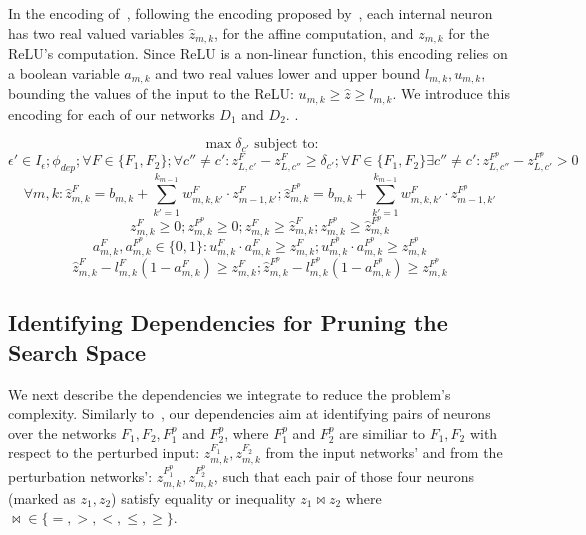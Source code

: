 In the encoding of~\cite{VHAGAR}, following the encoding proposed by~\cite{MIPVERIFY}, each internal neuron has two real valued variables $\hat{z}_{m,k}$, for the affine computation, and ${z}_{m,k}$ for the ReLU's computation. Since ReLU is a non-linear function, this encoding relies on a boolean variable $a_{m,k}$ and two real values lower and upper bound $l_{m,k},u_{m,k}$, bounding the values of the input to the ReLU: $u_{m,k}\geq{\hat{z}}\geq{l_{m,k}}$.
We introduce this encoding for each of our networks $D_1$ and $D_2$.
.

$$\max{\delta_{c'}} \text{ subject to:}$$
$$ \epsilon'\in{I_\epsilon}; \phi_{dep}; \forall{F}\in{\{F_1,F_2\}}; \forall{c''}\neq{c'}: z^{F}_{L,c'}-z^{F}_{L,c''}\geq\delta_{c'}; \forall{F}\in{\{F_1,F_2\}}\exists{c''}\neq{c'}: z^{F^p}_{L,c''}-z^{F^p}_{L,c'}>0$$
$$\forall{m,k}: \hat{z}^F_{m,k}=b_{m,k}+\sum_{k'=1}^{k_{m-1}} w^F_{m,k,k'}\cdot{z^F_{m-1,k'}}; \hat{z}^{F^p}_{m,k}=b_{m,k}+\sum_{k'=1}^{k_{m-1}} w^F_{m,k,k'}\cdot{z^{F^p}_{m-1,k'}}$$
$$z^F_{m,k}\geq0; z^{F^p}_{m,k}\geq0; z^F_{m,k}\geq{\hat{z}^F_{m,k}}; z^{F^p}_{m,k}\geq{\hat{z}^{F^p}_{m,k}}$$
$$a^F_{m,k},a^{F^p}_{m,k}\in{\{0,1\}}: u^F_{m,k}\cdot{a^F_{m,k}}\geq{z^F_{m,k}}; u^{F^p}_{m,k}\cdot{a^{F^p}_{m,k}}\geq{z^{F^p}_{m,k}}$$
$$\hat{z}^F_{m,k}-l^F_{m,k}(1-a^F_{m,k})\geq{z^F_{m,k}}; \hat{z}^{F^p}_{m,k}-l^{F^p}_{m,k}(1-a^{F^p}_{m,k})\geq{z^{F^p}_{m,k}}$$


\subsection{Identifying Dependencies for Pruning the Search Space}\label{PRUNESUBSECTION}
We next describe the dependencies we integrate to reduce the problem's complexity.
Similarly to~\cite{VHAGAR}, our dependencies aim at identifying pairs of neurons over the networks $F_1, F_2, F^p_1$ and $F^p_2$, where $F^p_1$ and $F^p_2$ are similiar to $F_1,F_2$ with respect to the perturbed input: %
$z^{F_1}_{m,k},z^{F_2}_{m,k}$ from the input networks' and from the perturbation networks': $z^{F^p_1}_{m,k}, z^{F^p_2}_{m,k}$, such that each pair of those four neurons (marked as $z_1,z_2$) satisfy equality or inequality $z_1\bowtie z_2$ where $\bowtie\in{\{=,>,<,\le,\ge\}}$. 

